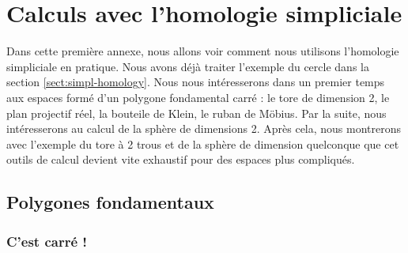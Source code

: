 \chapter{Calculs avec l'homologie simpliciale}\label{chap:annexe-simp-homo}

Dans cette première annexe, nous allons voir comment nous utilisons l'homologie simpliciale en pratique. Nous avons déjà traiter l'exemple du cercle dans la section \ref{sect:simpl-homology}. Nous nous intéresserons dans un premier temps aux espaces formé d'un polygone fondamental carré : le tore de dimension 2, le plan projectif réel, la bouteile de Klein, le ruban de Möbius. Par la suite, nous intéresserons au calcul de la sphère de dimensions 2. Après cela, nous montrerons avec l'exemple du tore à 2 trous et de la sphère de dimension quelconque que cet outils de calcul devient vite exhaustif pour des espaces plus compliqués.

\section{Polygones fondamentaux}

\subsection{C'est carré !}

